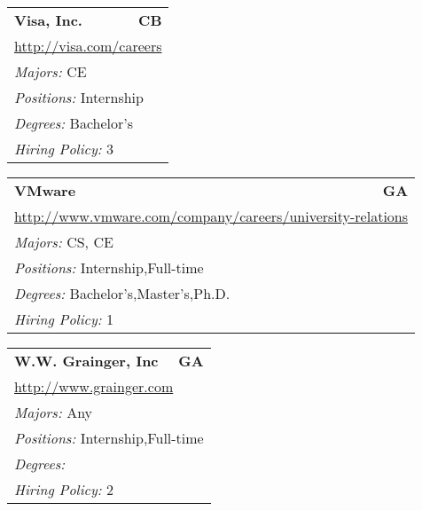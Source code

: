 \documentclass[twoside]{article}
\begin{document}
\begin{center}
\begin{multicols}{3}
\begin{FlushLeft}
\begin{minipage}{.9\columnwidth}
\end{minipage}
 
\begin{minipage}{.9\columnwidth}\begin{tabularx}{.95\columnwidth}{Xr}
                 {\Large\bf Visa, Inc.} & {\Large\bf CB}\\
    \multicolumn{2}{p{.95\columnwidth}}{\url{http://visa.com/careers}}\\
    \multicolumn{2}{p{.95\columnwidth}}{\emph{Majors:} CE}\\
    \multicolumn{2}{p{.95\columnwidth}}{\emph{Positions:} Internship}\\
    \multicolumn{2}{p{.95\columnwidth}}{\emph{Degrees:} Bachelor's}\\
    \multicolumn{2}{p{.95\columnwidth}}{\emph{Hiring Policy:} 3}\\
    \end{tabularx}
    
\end{minipage}
 
\begin{minipage}{.9\columnwidth}\begin{tabularx}{.95\columnwidth}{Xr}
                 {\Large\bf VMware} & {\Large\bf GA}\\
    \multicolumn{2}{p{.95\columnwidth}}{\url{http://www.vmware.com/company/careers/university-relations}}\\
    \multicolumn{2}{p{.95\columnwidth}}{\emph{Majors:} CS, CE}\\
    \multicolumn{2}{p{.95\columnwidth}}{\emph{Positions:} Internship,Full-time}\\
    \multicolumn{2}{p{.95\columnwidth}}{\emph{Degrees:} Bachelor's,Master's,Ph.D.}\\
    \multicolumn{2}{p{.95\columnwidth}}{\emph{Hiring Policy:} 1}\\
    \end{tabularx}
    
\end{minipage}
 
\begin{minipage}{.9\columnwidth}\begin{tabularx}{.95\columnwidth}{Xr}
                 {\Large\bf W.W. Grainger, Inc} & {\Large\bf GA}\\
    \multicolumn{2}{p{.95\columnwidth}}{\url{http://www.grainger.com}}\\
    \multicolumn{2}{p{.95\columnwidth}}{\emph{Majors:} Any}\\
    \multicolumn{2}{p{.95\columnwidth}}{\emph{Positions:} Internship,Full-time}\\
    \multicolumn{2}{p{.95\columnwidth}}{\emph{Degrees:} }\\
    \multicolumn{2}{p{.95\columnwidth}}{\emph{Hiring Policy:} 2}\\
    \end{tabularx}
    

\end{minipage}
\end{FlushLeft}
\end{multicols}
\end{center}
\end{document}

